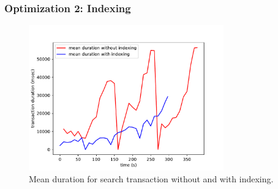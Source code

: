 \begin{frame}
\frametitle{Optimization 2: Indexing}
\begin{figure}
	\centering
	\includegraphics[width=0.75\textwidth]{images/search-transaction-duration-without-indexing-with-indexing}
	\caption{Mean duration for search transaction without and with indexing.}\label{fig:sqlopt}

\end{figure}
\end{frame}
